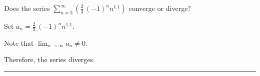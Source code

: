 \documentclass{ximera}
\begin{document}
\begin{question}
  Does the series \(\displaystyle\sum_{n=3}^\infty \left( \displaystyle\frac{2}{3} \, \left(-1\right)^{n} n^{1.1} \right)\) converge or diverge?

  \begin{solution}
    \begin{hint}
      Set \(a_{n} = \displaystyle\frac{2}{3} \, \left(-1\right)^{n} n^{1.1}\).
    \end{hint}
    \begin{hint}
      Note that \(\lim_{n \to \infty} a_n \neq 0\).
    \end{hint}
    \begin{hint}
      Therefore, the series diverges.
    \end{hint}


    \begin{multiple-choice}
    \end{multiple-choice}
    
  \end{solution}
\end{question}

\hrule
\end{document}
